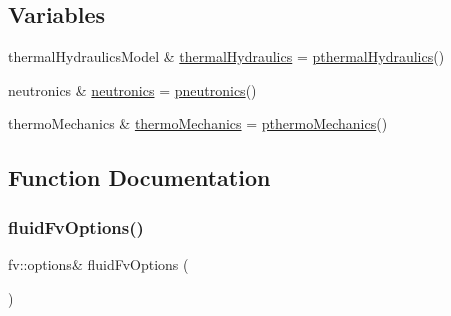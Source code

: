 \subsection*{Variables}
\begin{DoxyCompactItemize}
\item 
thermal\+Hydraulics\+Model \& \hyperlink{main_2include_2createFields_8H_ac5163bc9adc05d414b16080fc7a6b4ad}{thermal\+Hydraulics} = \hyperlink{main_2include_2createFields_8H_a6e7c411942456be713e28f4a4f0341ea}{pthermal\+Hydraulics}()
\item 
neutronics \& \hyperlink{main_2include_2createFields_8H_aba4910c7964b6a522b7f0b911f652e9d}{neutronics} = \hyperlink{main_2include_2createFields_8H_ac65a05feee810b5dd7ed790403f2fe3f}{pneutronics}()
\item 
thermo\+Mechanics \& \hyperlink{main_2include_2createFields_8H_a8a41bcd60d3796f489966759c96cfa7c}{thermo\+Mechanics} = \hyperlink{main_2include_2createFields_8H_ab036d44009bea51e0c6e6dbb1e6778b1}{pthermo\+Mechanics}()
\end{DoxyCompactItemize}


\subsection{Function Documentation}
\mbox{\label{main_2include_2createFields_8H_aba5acc97448d55d054e24c1c613b2bb8}} 
\subsubsection{\texorpdfstring{fluid\+Fv\+Options()}{fluidFvOptions()}}
{\footnotesize\ttfamily fv\+::options\& fluid\+Fv\+Options (\begin{DoxyParamCaption}\item[{fv\+::options\+::\+New(\hyperlink{createFluidMesh_8H_abc811848be202e7a888cde0339e0dd40}{fluid\+Mesh})}]{ }\end{DoxyParamCaption})}

\mbox{\label{main_2include_2createFields_8H_a708d6ddaa0b1e74427ecbd4938c5be4f}} 
